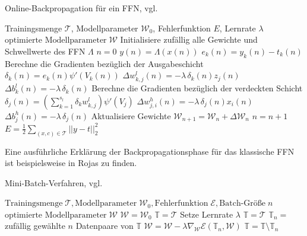 \begin{algorithm}
    \caption{Online-Backpropagation für ein FFN, vgl. \cite{du_diss}}
    \label{alg:online_backprop}
    \begin{algorithmic}
    \Require  Trainingsmenge $\mathcal{T}$, Modellparameter $\mathcal{W}_0$, Fehlerfunktion $E$, Lernrate $\lambda$ 
    \Ensure $\text{optimierte Modellparameter} \; \mathcal{W}$
    \State Initialisiere zufällig alle Gewichte und Schwellwerte des FFN $\Lambda$ 
    \State $n=0$  
     
        \State $y(n)=\Lambda(x(n))$
        \State $e_k(n)=y_k(n)-t_k(n)$
        \State Berechne die Gradienten bezüglich der Ausgabeschicht
        \State $\delta_k(n)= e_k(n) \psi'(V_k(n))$
        \State $\Delta w_{k,j}^l(n)= -\lambda \, \delta_k(n) z_j(n)$
        \State $\Delta b_{k}^l(n)= -\lambda \, \delta_k(n)$
        \State Berechne die Gradienten bezüglich der verdeckten Schicht
        \State $\delta_j(n)= \left(\sum_{k=1}^{s_l} \delta_k w_{k,j}^l\right) \psi'(V_j)$
        \State $\Delta w_{j,i}^h(n)= -\lambda \, \delta_j(n) x_i(n)$
        \State $\Delta b_{j}^h(n)= -\lambda \, \delta_j(n)$
        \State Aktualisiere Gewichte 
        \State $\mathcal{W}_{n+1}= \mathcal{W}_n + \Delta \mathcal{W}_n$
        \State $n=n+1$
    \EndFor
    \State $E=\frac{1}{2} \sum_{(x,c) \in \mathcal{T}} ||y-t||_2^2$
    \EndWhile
    \end{algorithmic}
\end{algorithm}





Eine ausführliche Erklärung der Backpropagationsphase für das klassische FFN ist beispielsweise in Rojas\cite{rojas96neural} zu finden.  

\begin{algorithm}
    \caption{Mini-Batch-Verfahren, vgl. \cite{gruening}}\label{alg:minibatch}
    \begin{algorithmic}
    \Require $ \text{Trainingsmenge} \; \mathcal{T}, \text{Modellparameter} \; \mathcal{W}_0, \text{Fehlerfunktion} \; \mathcal{E}, \text{Batch-Größe} \; n$
    \Ensure $\text{optimierte Modellparameter} \; \mathcal{W}$
    \State $\mathcal{W}=\mathcal{W}_0$
    \State $\mathbb{T}=\mathcal{T}$
    \State Setze Lernrate $\lambda$      
     
        \State $\mathbb{T}=\mathcal{T}$
    \EndIf
    \State $\mathbb{T}_n=$ zufällig gewählte $n$ Datenpaare von $\mathbb{T}$ 
    \State $\mathcal{W}=\mathcal{W}-\lambda \nabla_{\mathcal{W}} \mathcal{E}(\mathbb{T}_n,\mathcal{W})$
    \State $\mathbb{T}= \mathbb{T} \setminus \mathbb{T}_n$
    \EndWhile
    \end{algorithmic}
\end{algorithm}

